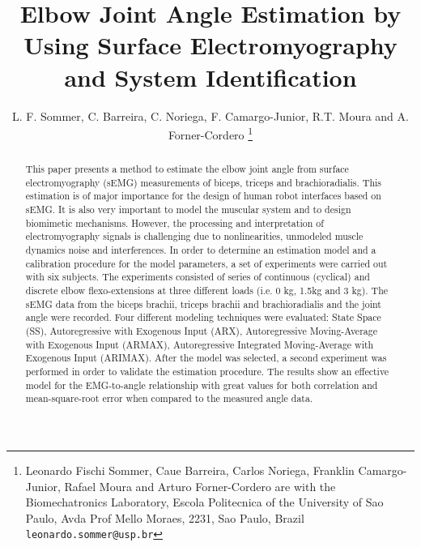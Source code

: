 \documentclass[letterpaper, 10 pt, conference]{ieeeconf}  %
\title{\LARGE \bf Elbow Joint Angle Estimation by Using Surface Electromyography and System Identification
}
\author{L. F. Sommer, C. Barreira, C. Noriega, F. Camargo-Junior, R.T. Moura and A. Forner-Cordero%
\thanks{Leonardo Fischi Sommer, Caue Barreira, Carlos Noriega, Franklin Camargo-Junior, Rafael Moura and Arturo Forner-Cordero are with the Biomechatronics Laboratory, Escola Politecnica of the University of Sao Paulo, Avda Prof Mello Moraes, 2231, Sao Paulo, Brazil {\tt\small leonardo.sommer@usp.br}}
}
\begin{document}
\maketitle
\thispagestyle{empty}
\pagestyle{empty}


\begin{abstract}


This paper presents a method to estimate the elbow joint angle from surface electromyography (sEMG) measurements of biceps, triceps and brachioradialis. This estimation is of major importance for the design of human robot interfaces based on sEMG. It is also very important to model the muscular system and to design biomimetic mechanisms. However, the processing and interpretation of electromyography signals is challenging due to nonlinearities, unmodeled muscle dynamics noise and interferences. In order to determine an estimation model and a calibration procedure for the model parameters, a set of experiments were carried out with six subjects. The experiments consisted of series of continuous (cyclical) and discrete elbow flexo-extensions at three different loads (i.e. 0 kg, 1.5kg and 3 kg). The sEMG data from the biceps brachii, triceps brachii and brachioradialis and the joint angle were recorded. Four different modeling techniques were evaluated: State Space (SS), Autoregressive with Exogenous Input (ARX), Autoregressive Moving-Average with Exogenous Input (ARMAX), Autoregressive Integrated Moving-Average with Exogenous Input (ARIMAX). After the model was selected, a second experiment was performed in order to validate the estimation procedure. The results show an effective model for the EMG-to-angle relationship with great values for both correlation and mean-square-root error when compared to the measured angle data.

\end{abstract}
\end{document}
